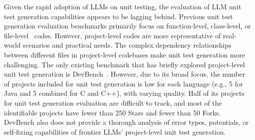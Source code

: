 Given the rapid adoption of LLMs on unit testing, the evaluation of LLM unit test generation capabilities appears to be lagging behind. 
Previous unit test generation evaluation benchmarks primarily focus on function-level, class-level, or file-level~\cite{chen2021evaluating, du2023classeval, wang2024testeval, jain2024testgeneval} codes. However, project-level codes are more representative of real-world scenarios and practical needs. The complex dependency relationships between different files in project-level codebases make unit test generation more challenging.
The only existing benchmark that has briefly explored project-level unit test generation is DevBench~\cite{li2024devbench}. 
However, due to its broad focus, the number of projects included for unit test generation is low for each language (e.g., 5 for Java and 5 combined for C and C++), with varying quality.
Half of its projects for unit test generation evaluation are difficult to track, and most of the identifiable projects have fewer than 250 Stars and fewer than 50 Forks.
DevBench also does not provide a thorough analysis of error types, potentials, or self-fixing capabilities of frontier LLMs' project-level unit test generation.




